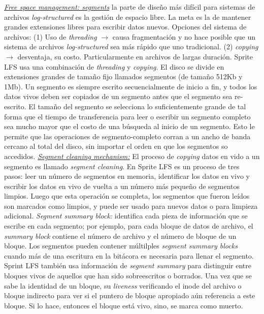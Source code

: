 \underline{\emph{Free space management: segments}} la parte de diseño más difícil para sistemas de archivos \emph{log-structured} es la gestión de espacio libre. La meta es la de mantener grandes extensiones libres para escribir datos nuevos. Opciones del sistema de archivos: (1) Uso de \emph{threading} $\to$ causa fragmentación y no hace posible que un sistema de archivos \emph{log-structured} sea más rápido que uno tradicional. (2) \emph{copying} $\to$ desventaja, su costo. Particularmente en archivos de largas duración. Sprite LFS usa una combinación de \emph{threading} y \emph{copying}. El disco se divide en extensiones grandes de tamaño fijo llamados segmentos (de tamaño 512Kb y 1Mb). Un segmento es siempre escrito secuencialmente de inicio a fin, y todos los datos vivos deben ser copiados de un segmento antes que el segmento sea re-escrito. El tamaño del segmento se selecciona lo suficientemente grande de tal forma que el tiempo de transferencia para leer o escribir un segmento completo sea mucho mayor que el costo de una búsqueda al inicio de un segmento. Esto le permite que las operaciones de segmento-completo corran a un ancho de banda cercano al total del disco, sin importar el orden en que los segmentos so accedidos. \underline{\emph{Segment cleaning mechanism:}} El proceso de \emph{copying} datos en vido a un segmento es llamado \emph{segment cleaning}. En Sprite LFS es un proceso de tres pasos: leer un número de segmentos en memoria, identificar los datos en vivo y escribir los datos en vivo de vuelta a un número más pequeño de segmentos limpios. Luego que esta operación se completa, los segmentos que fueron leídos son marcados como limpios, y puede ser usado para nuevos datos o para limpieza adicional. \emph{Segment summary block:} identifica cada pieza de información que se escribe en cada segmento; por ejemplo, para cada bloque de datos de archivo, el \emph{summary block} contiene el número de archivo y el número de bloque de un bloque. Los segmentos pueden contener múltilples \emph{segment summary blocks} cuando más de una escritura en la bitácora es necesaria para llenar el segmento. Sprint LFS también usa información de \emph{segment summary} para distinguir entre bloques vivos de aquellos que han sido sobreescritos o borrados. Una vez que se sabe la identidad de un bloque, su \emph{liveness} verificando el inode del archivo o bloque indirecto para ver si el puntero de bloque apropiado aún referencia a este bloque. Si lo hace, entonces el bloque está vivo, sino, se marca como muerto. 

